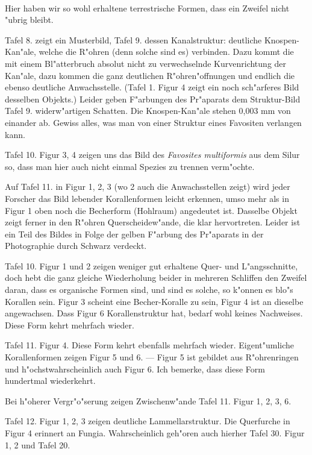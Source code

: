 \documentclass[a4paper, 11pt, oneside]{article}
\begin{document}
\paragraph{}
Hier haben wir so wohl erhaltene terrestrische Formen, dass ein Zweifel nicht "ubrig bleibt.

Tafel 8. zeigt ein Musterbild, Tafel 9. dessen Kanalstruktur: deutliche Knospen-Kan"ale, welche die R"ohren (denn solche sind es) verbinden. Dazu kommt die mit einem Bl"atterbruch absolut nicht zu verwechselnde Kurvenrichtung der Kan"ale, dazu kommen die ganz deutlichen R"ohren"offnungen und endlich die ebenso deutliche Anwachsstelle. (Tafel 1. Figur 4 zeigt ein noch sch"arferes Bild desselben Objekts.) Leider geben F"arbungen des Pr"aparats dem Struktur-Bild Tafel 9. widerw"artigen Schatten. Die Knospen-Kan"ale stehen 0,003 mm von einander ab. Gewiss alles, was man von einer Struktur eines Favositen verlangen kann.

Tafel 10. Figur 3, 4 zeigen uns das Bild des \emph{Favosites multiformis} aus dem Silur so, dass man hier auch nicht einmal Spezies zu trennen verm"ochte.

Auf Tafel 11. in Figur 1, 2, 3 (wo 2 auch die Anwachsstellen zeigt) wird jeder Forscher das Bild lebender Korallenformen leicht erkennen, umso mehr als in Figur 1 oben noch die Becherform (Hohlraum) angedeutet ist. Dasselbe Objekt zeigt ferner in den R"ohren Querscheidew"ande, die klar hervortreten. Leider ist ein Teil des Bildes in Folge der gelben F"arbung des Pr"aparats in der Photographie durch Schwarz verdeckt.

Tafel 10. Figur 1 und 2 zeigen weniger gut erhaltene Quer- und L"angsschnitte, doch hebt die ganz gleiche Wiederholung beider in mehreren Schliffen den Zweifel daran, dass es organische Formen sind, und sind es solche, so k"onnen es blo"s Korallen sein. Figur 3 scheint eine Becher-Koralle zu sein, Figur 4 ist an dieselbe angewachsen. Dass Figur 6 Korallenstruktur hat, bedarf wohl keines Nachweises. Diese Form kehrt mehrfach wieder.

Tafel 11. Figur 4. Diese Form kehrt ebenfalls mehrfach wieder. Eigent"umliche Korallenformen zeigen Figur 5 und 6. --- Figur 5 ist gebildet aus R"ohrenringen und h"ochstwahrscheinlich auch Figur 6. Ich bemerke, dass diese Form hundertmal wiederkehrt.

Bei h"oherer Vergr"o"serung zeigen Zwischenw"ande Tafel 11. Figur 1, 2, 3, 6.

Tafel 12. Figur 1, 2, 3 zeigen deutliche Lammellarstruktur. Die Querfurche in Figur 4 erinnert an Fungia. Wahrscheinlich geh"oren auch hierher Tafel 30. Figur 1, 2 und Tafel 20.
\end{document}

